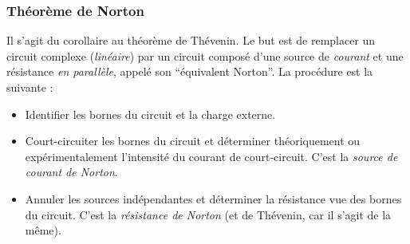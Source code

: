 \documentclass[12pt,a4paper]{article}
\begin{document}
\subsubsection{Théorème de Norton}
Il s'agit du corollaire au théorème de Thévenin. Le but est de remplacer un circuit complexe (\textit{linéaire}) par un circuit composé d'une source de \textit{courant} et une résistance \textit{en parallèle}, appelé son ``équivalent Norton''. La procédure est la suivante :
\begin{itemize}
	\item 	Identifier les bornes du circuit et la charge externe.
	\item 	Court-circuiter les bornes du circuit et déterminer théoriquement ou expérimentalement l'intensité du courant de court-circuit. C'est la \textit{source de courant de Norton}.
	\item 	Annuler les sources indépendantes et déterminer la résistance vue des bornes du circuit. C'est la \textit{résistance de Norton} (et de Thévenin, car il s'agit de la même).
\end{itemize}
\end{document}
